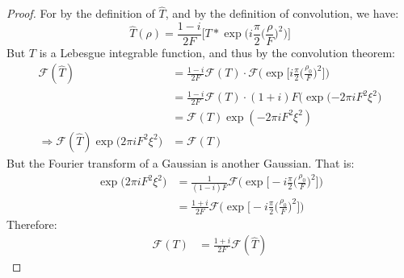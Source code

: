    \begin{proof}
        For by the definition of $\hat{T}$, and by the
        definition of convolution, we have:
        \begin{equation}
            \hat{T}(\rho)
            =\frac{1-i}{2F}\Big[
                T*\exp\Big(i\frac{\pi}{2}\big(\frac{\rho}{F}\big)^{2}
            \Big)\Big]
        \end{equation}
        But $T$ is a Lebesgue integrable function, and thus by
        the convolution theorem:
        \begin{subequations}
            \begin{align}
                \mathcal{F}(\hat{T})
                &=\frac{1-i}{2F}\mathcal{F}(T)\cdot
                    \mathcal{F}\Big(
                        \exp\Big[i\frac{\pi}{2}
                        \big(\frac{\rho_{0}}{F}\big)^{2}
                    \Big]\Big)\\
                &=\frac{1-i}{2F}\mathcal{F}(T)\cdot
                    (1+i)F\big(
                        \exp(\minus{2}\pi{i}F^{2}\xi^{2}
                    \big)\\
                &=\mathcal{F}(T)\exp(\minus{2}\pi{i}F^{2}\xi^{2})\\
                    \Rightarrow
                    \mathcal{F}(\hat{T})
                    \exp\big(2\pi{i}F^{2}\xi^{2}\big)
                &=\mathcal{F}(T)
            \end{align}
        \end{subequations}
        But the Fourier transform of a Gaussian is
        another Gaussian. That is:
        \begin{subequations}
            \begin{align}
                \exp\big(2\pi{i}F^{2}\xi^{2}\big)
                &=\frac{1}{(1-i)F}\mathcal{F}\Big(
                    \exp\Big[\minus{i}\frac{\pi}{2}
                    \big(\frac{\rho_{0}}{F}\big)^{2}\Big]\Big)\\
                &=\frac{1+i}{2F}\mathcal{F}\Big(
                    \exp\Big[\minus{i}\frac{\pi}{2}
                        \big(\frac{\rho_0}{F}\big)^{2}
                    \Big]\Big)
            \end{align}
        \end{subequations}
        Therefore:
        \begin{subequations}
            \begin{align}
                \mathcal{F}(T)
                &=\frac{1+i}{2F}\mathcal{F}(\hat{T})

\end{align}
\end{subequations}
\end{proof}
